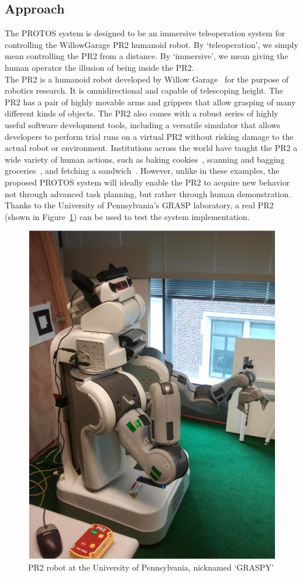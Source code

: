 \documentclass{sig-alternate}
\begin{document}
\subsection{Approach}
\indent The PROTOS system is designed to be an immersive teleoperation system for controlling the WillowGarage PR2 humanoid robot. By `teleoperation', we simply mean controlling the PR2 from
a distance. By `immersive', we mean giving the human operator the illusion of being inside the PR2.\\
\indent The PR2 is a humanoid robot developed by  Willow Garage~\cite{pr2} for the purpose of robotics 
research. It is omnidirectional and capable of telescoping height. The PR2 has a pair of highly movable arms and grippers
that allow grasping of many different kinds of objects. The PR2 also comes with a robust series of highly useful software development tools,
including a versatile simulator that allows developers to perform trial runs on a virtual PR2 without
risking damage to the actual robot or environment. Institutions across the
world have taught the PR2 a wide variety of human actions, such as baking 
cookies~\cite{cookies}, scanning and bagging groceries~\cite{groceries}, and fetching a sandwich~\cite{subway}.
 However, unlike in these examples, the proposed PROTOS system will ideally enable the PR2 to acquire new behavior not through advanced task planning,
but rather through human demonstration. Thanks to the University of Pennsylvania's GRASP laboratory, a real PR2 (shown in Figure~\ref{fig:pr2_photo}) can be used to test the
system implementation.\\
\begin{figure}[htb] 
	\begin{center}
		\includegraphics[width=0.75\linewidth]{graspy}
	\end{center}
	\caption{PR2 robot at the University of Pennsylvania, nicknamed `GRASPY'}
	\label{fig:pr2_photo}
\end{figure}
\end{document}
